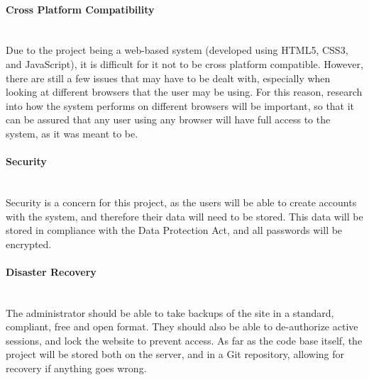 \paragraph{Cross Platform Compatibility}\ \\
Due to the project being a web-based system (developed using HTML5, CSS3, and JavaScript), it is difficult for it not to be cross platform compatible. However, there are still a few issues that may have to be dealt with, especially when looking at different browsers that the user may be using. For this reason, research into how the system performs on different browsers will be important, so that it can be assured that any user using any browser will have full access to the system, as it was meant to be.

\paragraph{Security}\ \\
Security is a concern for this project, as the users will be able to create accounts with the system, and therefore their data will need to be stored. This data will be stored in compliance with the Data Protection Act, and all passwords will be encrypted. 

\paragraph{Disaster Recovery}\ \\
The administrator should be able to take backups of the site in a standard, compliant, free and open format. They should also be able to de-authorize active sessions, and lock the website to prevent access. As far as the code base itself, the project will be stored both on the server, and in a Git repository, allowing for recovery if anything goes wrong.